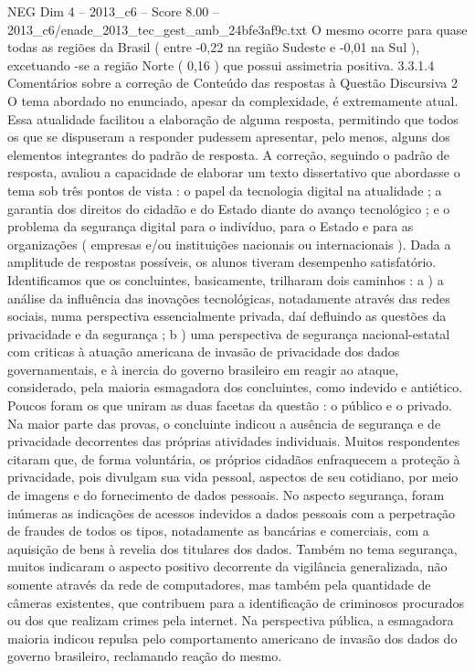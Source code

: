 \begin{textsample}{NEG Dim 4 – 2013\_c6 – Score 8.00 – 2013\_c6/enade\_2013\_tec\_gest\_amb\_24bfe3af9c.txt}
O mesmo ocorre para quase todas as regiões da Brasil ( entre -0,22 na região Sudeste e -0,01 na Sul ), excetuando -se a região Norte ( 0,16 ) que possui assimetria positiva. 3.3.1.4 Comentários sobre a correção de Conteúdo das respostas à Questão Discursiva 2 O tema abordado no enunciado, apesar da complexidade, é extremamente atual.
Essa atualidade facilitou a elaboração de alguma resposta, permitindo que todos os que se dispuseram a responder pudessem apresentar, pelo menos, alguns dos elementos integrantes do padrão de resposta.
A correção, seguindo o padrão de resposta, avaliou a capacidade de elaborar um texto dissertativo que abordasse o tema sob três pontos de vista : o papel da tecnologia digital na atualidade ; a garantia dos direitos do cidadão e do Estado diante do avanço tecnológico ; e o problema da segurança digital para o indivíduo, para o Estado e para as organizações ( empresas e/ou instituições nacionais ou internacionais ).
Dada a amplitude de respostas possíveis, os alunos tiveram desempenho satisfatório.
Identificamos que os concluintes, basicamente, trilharam dois caminhos : a ) a análise da influência das inovações tecnológicas, notadamente através das redes sociais, numa perspectiva essencialmente privada, daí defluindo as questões da privacidade e da segurança ; b ) uma perspectiva de segurança nacional-estatal com criticas à atuação americana de invasão de privacidade dos dados governamentais, e à inercia do governo brasileiro em reagir ao ataque, considerado, pela maioria esmagadora dos concluintes, como indevido e antiético.
Poucos foram os que uniram as duas facetas da questão : o público e o privado.
Na maior parte das provas, o concluinte indicou a ausência de segurança e de privacidade decorrentes das próprias atividades individuais.
Muitos respondentes citaram que, de forma voluntária, os próprios cidadãos enfraquecem a proteção à privacidade, pois divulgam sua vida pessoal, aspectos de seu cotidiano, por meio de imagens e do fornecimento de dados pessoais.
No aspecto segurança, foram inúmeras as indicações de acessos indevidos a dados pessoais com a perpetração de fraudes de todos os tipos, notadamente as bancárias e comerciais, com a aquisição de bens à revelia dos titulares dos dados.
Também no tema segurança, muitos indicaram o aspecto positivo decorrente da vigilância generalizada, não somente através da rede de computadores, mas também pela quantidade de câmeras existentes, que contribuem para a identificação de criminosos procurados ou dos que realizam crimes pela internet.
Na perspectiva pública, a esmagadora maioria indicou repulsa pelo comportamento americano de invasão dos dados do governo brasileiro, reclamando reação do mesmo.

\end{textsample}
